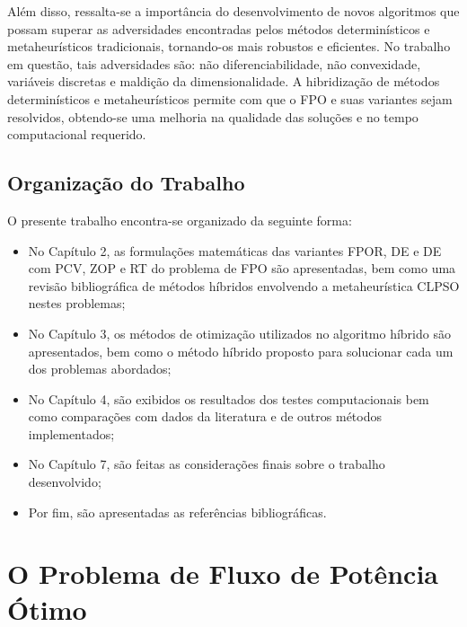 \documentclass[
	12pt,				%
	openany,			%
	twoside,			%
	a4paper,			%
	chapter=TITLE,		%
	section=Title,		%
	subsection=Title,	%
	subsubsection=Title,%
	english,			%
	french,				%
	spanish,			%
	brazil			%
	]{abntex2}
\begin{document}
\begin{ERRATA}
Além disso, ressalta-se a importância do desenvolvimento de novos algoritmos que possam superar as adversidades encontradas pelos métodos determinísticos e metaheurísticos tradicionais, tornando-os mais robustos e eficientes. No trabalho em questão, tais adversidades são: não diferenciabilidade, não convexidade, variáveis discretas e maldição da dimensionalidade. A hibridização de métodos determinísticos e metaheurísticos permite com que o FPO e suas variantes sejam resolvidos, obtendo-se uma melhoria na qualidade das soluções e no tempo computacional requerido.


\section{Organização do Trabalho}

O presente trabalho encontra-se organizado da seguinte forma:

\begin{itemize}
    \item No Capítulo 2, as formulações matemáticas das variantes FPOR, DE e DE com PCV, ZOP e RT do problema de FPO são apresentadas, bem como uma revisão bibliográfica de métodos híbridos envolvendo a metaheurística CLPSO nestes problemas;
    
    \item No Capítulo 3, os métodos de otimização utilizados no algoritmo híbrido são apresentados, bem como o método híbrido proposto para solucionar cada um dos problemas abordados;

    \item No Capítulo 4, são exibidos os resultados dos testes computacionais bem como comparações com dados da literatura e de outros métodos implementados;
    
    \item No Capítulo 7, são feitas as considerações finais sobre o trabalho desenvolvido;
    
    \item Por fim, são apresentadas as referências bibliográficas.
    
\end{itemize}



\chapter{O Problema de Fluxo de Potência Ótimo}


\end{ERRATA}
\end{document}

